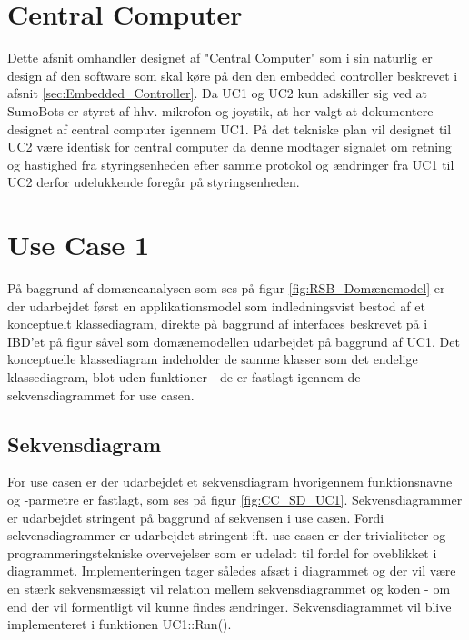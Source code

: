 \section{Central Computer}\label{sec:CC:design}
Dette afsnit omhandler designet af "Central Computer" som i sin naturlig er design af den software som skal køre på den den embedded controller beskrevet i afsnit  \ref{sec:Embedded_Controller}. Da UC1 og UC2 kun adskiller sig ved at SumoBots er styret af hhv. mikrofon og joystik, at her valgt at dokumentere designet af central computer igennem UC1. På det tekniske plan vil designet til UC2 være identisk for central computer da denne modtager signalet om retning og hastighed fra styringsenheden efter samme protokol og ændringer fra UC1 til UC2 derfor udelukkende foregår på styringsenheden.  


\section{Use Case 1}
På baggrund af domæneanalysen som ses på figur \ref{fig:RSB_Domænemodel} er der udarbejdet først en applikationsmodel\cite{ApplikationsmodellerI2ISE} som indledningsvist bestod af et konceptuelt klassediagram, direkte på baggrund af interfaces beskrevet på i IBD'et på figur  såvel som domænemodellen udarbejdet på baggrund af UC1. Det konceptuelle klassediagram indeholder de samme klasser som det endelige klassediagram, blot uden funktioner - de er fastlagt igennem de sekvensdiagrammet for use casen.

\subsection{Sekvensdiagram}
For use casen er der udarbejdet et sekvensdiagram hvorigennem funktionsnavne og -parmetre er fastlagt, som ses på figur \ref{fig:CC_SD_UC1}. Sekvensdiagrammer er udarbejdet stringent på baggrund af sekvensen i use casen. Fordi sekvensdiagrammer er udarbejdet stringent ift. use casen er der trivialiteter og programmeringstekniske overvejelser som er udeladt til fordel for oveblikket i diagrammet. Implementeringen tager således afsæt i diagrammet og der vil være en stærk sekvensmæssigt vil relation mellem sekvensdiagrammet og koden - om end der vil formentligt vil kunne findes ændringer. Sekvensdiagrammet vil blive implementeret i funktionen UC1::Run(). 

